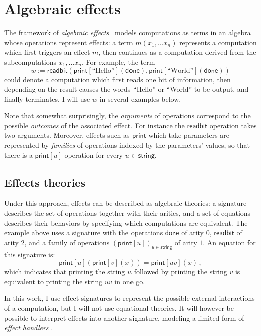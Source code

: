 \documentclass[11pt,oneside,draft]{book}
\theoremstyle{definition}
\newcommand{\kw}[1]{\ensuremath{ \mathsf{#1} }}
\begin{document}


\section{Algebraic effects} \label{sec:eff} %


The framework of \emph{algebraic effects}~\citep{effadq}
models computations as terms in an algebra
whose operations represent effects:
a term $m(x_1, \ldots x_n)$
represents a computation which first
triggers an effect $m$,
then continues as a computation derived from
the subcomputations $x_1, \ldots x_n$.
For example,
the term
\[
  w :=
    \kw{readbit}(
      \kw{print}[\text{``Hello''}](\kw{done}),
      \kw{print}[\text{``World''}](\kw{done}))
\]
could denote a computation which
first reads one bit of information,
then depending on the result
causes the words ``Hello'' or ``World'' to be output,
and finally terminates.
I will use $w$ in several examples below.

Note that somewhat surprisingly,
the \emph{arguments} of operations correspond to
the possible \emph{outcomes} of the associated effect.
For instance the $\kw{readbit}$ operation takes two arguments.
Moreover,
effects such as $\kw{print}$
which take parameters
are represented by \emph{families}
of operations indexed by the parameters' values,
so that there is a $\kw{print}[u]$
operation for every $u \in \kw{string}$.


\subsection{Effects theories} %

Under this approach,
effects can be described as algebraic theories:
a signature describes the set of operations together with their arities,
and a set of equations describes their behaviors
by specifying which computations are equivalent.
The example above uses a signature with the operations
$\kw{done}$ of arity $0$,
$\kw{readbit}$ of arity $2$,
and a family of operations $(\kw{print}[u])_{u \in \kw{string}}$
of arity $1$.
An equation for this signature is:
\[
    \kw{print}[u](\kw{print}[v](x)) =
    \kw{print}[uv](x) \,,
\]
which indicates that
printing the string $u$ followed by
printing the string $v$ is equivalent to
printing the string $uv$ in one go.

In this work,
I use effect signatures to represent
the possible external interactions
of a computation,
but I will not use equational theories.
It will however be possible to interpret effects
into another signature,
modeling a limited form of
\emph{effect handlers} \citep{eff}.
\end{document}
